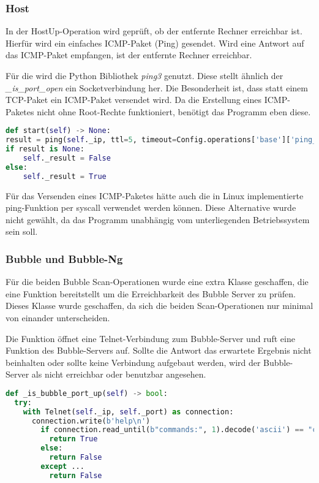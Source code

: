 \subsubsection{Host}
In der HostUp-Operation wird geprüft, ob der entfernte Rechner erreichbar ist. Hierfür wird ein einfaches ICMP-Paket (Ping) gesendet. Wird eine Antwort auf das ICMP-Paket empfangen, ist der entfernte Rechner erreichbar.

Für die wird die Python Bibliothek \textit{ping3} genutzt. Diese stellt ähnlich der \textit{\_is\_port\_open} ein Socketverbindung her. Die Besonderheit ist, dass statt einem TCP-Paket ein ICMP-Paket versendet wird. Da die Erstellung eines ICMP-Paketes nicht ohne Root-Rechte funktioniert, benötigt das Programm eben diese.

\begin{lstlisting}[language=Python, frame=single, caption={Big Brother HostUp Ping}, captionpos=b, label={lst:bigbrother-host-up}]
def start(self) -> None:
result = ping(self._ip, ttl=5, timeout=Config.operations['base']['ping_timeout'])
if result is None:
	self._result = False
else:
	self._result = True
\end{lstlisting}

Für das Versenden eines ICMP-Paketes hätte auch  die in Linux implementierte ping-Funktion per syscall verwendet werden können. Diese Alternative wurde nicht gewählt, da das Programm unabhängig vom unterliegenden Betriebssystem sein soll.
 
\subsubsection{Bubble und Bubble-Ng}
Für die beiden Bubble Scan-Operationen wurde eine extra Klasse geschaffen, die eine Funktion bereitstellt um die Erreichbarkeit des Bubble Server zu prüfen. Dieses Klasse wurde geschaffen, da sich die beiden Scan-Operationen nur minimal von einander unterscheiden.

Die Funktion öffnet eine Telnet-Verbindung zum Bubble-Server und ruft eine Funktion des Bubble-Servers auf. Sollte die Antwort das erwartete Ergebnis nicht beinhalten oder sollte keine Verbindung aufgebaut werden, wird der Bubble-Server  als nicht erreichbar oder benutzbar angesehen.

\begin{lstlisting}[language=Python, frame=single, caption={Big Brother todo}, captionpos=b, label={lst:bigbrother-host-up}]
def _is_bubble_port_up(self) -> bool:
  try:
    with Telnet(self._ip, self._port) as connection:
      connection.write(b'help\n')
        if connection.read_until(b"commands:", 1).decode('ascii') == "commands:":
          return True
        else:
          return False
        except ...
          return False
\end{lstlisting} 

